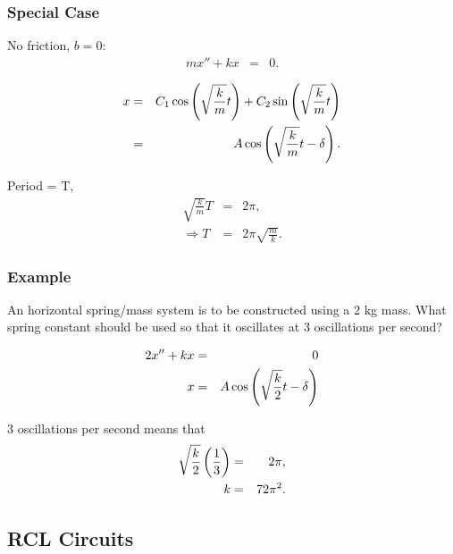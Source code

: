 \begin{frame}
  \frametitle{Special Case}

  No friction, $b=0$:
  \begin{eqnarray*}
    m x'' + kx & = & 0.
  \end{eqnarray*}

  \begin{eqnarray*}
    x & = & C_1 \cos\left(\sqrt{\frac{k}{m}} t\right) +
    C_2 \sin\left(\sqrt{\frac{k}{m}} t\right) \\
    & = & A \cos\left( \sqrt{\frac{k}{m}} t - \delta \right).
  \end{eqnarray*}

  Period = T,
  \begin{eqnarray*}
    \sqrt{\frac{k}{m}} T & = & 2\pi, \\
    \Rightarrow T & = & 2 \pi \sqrt{\frac{m}{k}}.
  \end{eqnarray*}

\end{frame}


\begin{frame}
  \frametitle{Example}

  An horizontal spring/mass system is to be constructed using a 2 kg
  mass. What spring constant should be used so that it oscillates at 3
  oscillations per second?

  \begin{eqnarray*}
    2 x'' + kx & = & 0 \\
    x & = & A \cos\left( \sqrt{\frac{k}{2}} t - \delta \right) \\
  \end{eqnarray*}

  {
    3 oscillations per second means that
    \begin{eqnarray*}
      \sqrt{\frac{k}{2}} \left( \frac{1}{3} \right) & = & 2 \pi, \\
      k & = & 72 \pi^2.
    \end{eqnarray*}
  }

\end{frame}

\subsection{RCL Circuits}

